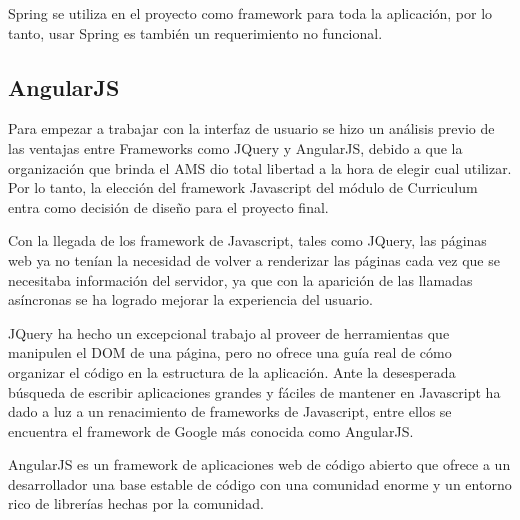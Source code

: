 Spring se utiliza en el proyecto como framework para toda la aplicación, por lo tanto, usar Spring es también un requerimiento no funcional.

\subsection{AngularJS}
Para empezar a trabajar con la interfaz de usuario se hizo un análisis previo de las ventajas entre Frameworks como JQuery y AngularJS, debido a que la organización que brinda el AMS dio total libertad a la hora de elegir cual utilizar. Por lo tanto, la elección del framework Javascript del módulo de Curriculum entra como decisión de diseño para el proyecto final. 

Con la llegada de los framework de Javascript, tales como JQuery, las páginas web ya no tenían la necesidad de volver a renderizar las páginas cada vez que se necesitaba información del servidor, ya que con la aparición de las llamadas asíncronas se ha logrado mejorar la experiencia del usuario\citep{ruebbelke2015angularjs}.

JQuery ha hecho un excepcional trabajo al proveer de herramientas que manipulen el DOM de una página, pero no ofrece una guía real de cómo organizar el código en la estructura de la aplicación. Ante la desesperada búsqueda de escribir aplicaciones grandes y fáciles de mantener en Javascript ha dado a luz a un renacimiento de frameworks de Javascript, entre ellos se encuentra el framework de Google más conocida como AngularJS.

AngularJS es un framework de aplicaciones web de código abierto que ofrece a un desarrollador una base estable de código con una comunidad enorme y un entorno rico de librerías hechas por la comunidad\citep{darwin2013angularjs}.